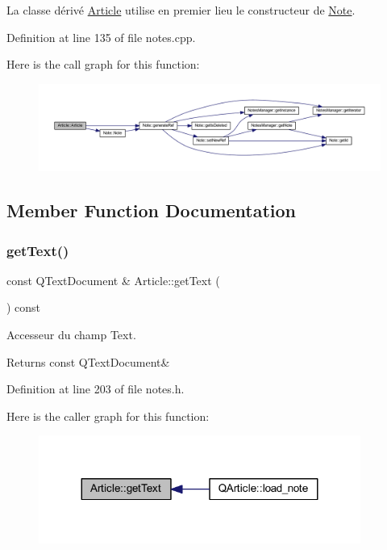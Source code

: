 La classe dérivé \hyperlink{class_article}{Article} utilise en premier lieu le constructeur de \hyperlink{class_note}{Note}. 

Definition at line 135 of file notes.\+cpp.

Here is the call graph for this function\+:\nopagebreak
\begin{figure}[H]
\begin{center}
\leavevmode
\includegraphics[width=350pt]{class_article_af3f6b98ba3cc46aaa5625a17266eb67f_cgraph}
\end{center}
\end{figure}


\subsection{Member Function Documentation}
\mbox{\label{class_article_a178a250fddb6c30288d893f4f3439ca8}} 
\subsubsection{\texorpdfstring{get\+Text()}{getText()}}
{\footnotesize\ttfamily const Q\+Text\+Document \& Article\+::get\+Text (\begin{DoxyParamCaption}{ }\end{DoxyParamCaption}) const\hspace{0.3cm}{\ttfamily [inline]}}



Accesseur du champ Text. 

\begin{DoxyReturn}{Returns}
const Q\+Text\+Document\& 
\end{DoxyReturn}


Definition at line 203 of file notes.\+h.

Here is the caller graph for this function\+:\nopagebreak
\begin{figure}[H]
\begin{center}
\leavevmode
\includegraphics[width=299pt]{class_article_a178a250fddb6c30288d893f4f3439ca8_icgraph}
\end{center}
\end{figure}
\mbox{\label{class_article_ae4059abc035598ff3faf554fd74a1492}} 
